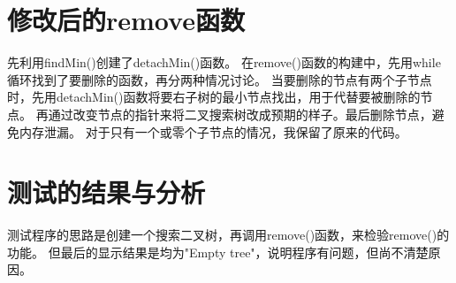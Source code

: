 \documentclass[UTF8]{ctexart}
\begin{document}
\pagestyle{fancy}
\fancyhead{}

\section{修改后的remove函数}

先利用findMin()创建了detachMin()函数。
在remove()函数的构建中，先用while循环找到了要删除的函数，再分两种情况讨论。
当要删除的节点有两个子节点时，先用detachMin()函数将要右子树的最小节点找出，用于代替要被删除的节点。
再通过改变节点的指针来将二叉搜索树改成预期的样子。最后删除节点，避免内存泄漏。
对于只有一个或零个子节点的情况，我保留了原来的代码。

\section{测试的结果与分析}

测试程序的思路是创建一个搜索二叉树，再调用remove()函数，来检验remove()的功能。
但最后的显示结果是均为"Empty tree"，说明程序有问题，但尚不清楚原因。
\end{document}
